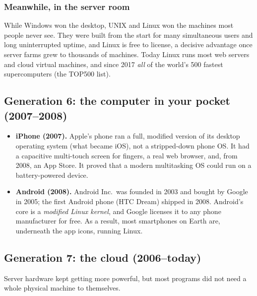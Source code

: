 \documentclass[11pt,a4paper]{article}
\begin{document}
\subsubsection{Meanwhile, in the server room}
While Windows won the desktop, UNIX and Linux won the machines most people never see. They were built from the start for many simultaneous users and long uninterrupted uptime, and Linux is free to license, a decisive advantage once server farms grew to thousands of machines. Today Linux runs most web servers and cloud virtual machines, and since 2017 \emph{all} of the world's 500 fastest supercomputers (the TOP500 list).

\subsection{Generation 6: the computer in your pocket (2007--2008)}

\begin{itemize}
  \item \textbf{iPhone (2007).} Apple's phone ran a full, modified version of its desktop operating system (what became iOS), not a stripped-down phone OS. It had a capacitive multi-touch screen for fingers, a real web browser, and, from 2008, an App Store. It proved that a modern multitasking OS could run on a battery-powered device.
  \item \textbf{Android (2008).} Android Inc.\ was founded in 2003 and bought by Google in 2005; the first Android phone (HTC Dream) shipped in 2008. Android's core is a \emph{modified Linux kernel}, and Google licenses it to any phone manufacturer for free. As a result, most smartphones on Earth are, underneath the app icons, running Linux.
\end{itemize}

\subsection{Generation 7: the cloud (2006--today)}

Server hardware kept getting more powerful, but most programs did not need a whole physical machine to themselves.
\end{document}
